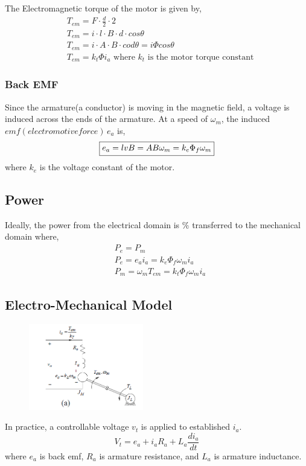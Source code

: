 \documentclass{article}
\begin{document}
    The Electromagnetic torque of the motor is given by,
    \begin{align*}
        &T_{em} = F \cdot \frac{d}{2} \cdot 2\\
        &T_{em} = i\cdot l \cdot B \cdot d \cdot cos \theta \\
        &T_{em} = i \cdot A \cdot B \cdot cod \theta = i \Phi cos\theta\\
        &\boxed{T_{em} = k_{t} \Phi i_{a} } \text{ where $k_{t}$ is the motor torque constant}
    \end{align*}

    \subsubsection*{Back EMF}
    Since the armature(a conductor) is moving in the magnetic field, a voltage is induced 
    across the ends of the armature.
    At a speed of $\omega_{m}$, the induced $emf(electromotive force)\,e_{a}$ is,
    \begin{equation*}
        \boxed{e_{a} = lvB = A B \omega_{m} = k_{e}\Phi_{f} \omega_{m}} \\
    \end{equation*}
    where $k_{e}$ is the voltage constant of the motor.

    \subsection*{Power}
    Ideally, the power from the electrical domain is $\%$ transferred to the mechanical domain where,
    \begin{align*}
        &P_{e} = P_{m}\\
        &P_{e} = e_{a}i_{a} = k_{e} \Phi_{f} \omega_{m} i_{a}\\
        &P_{m} = \omega_{m}T_{em} =  k_{t} \Phi_{f} \omega_{m} i_{a}
    \end{align*}

    \subsection*{Electro-Mechanical Model}
    \begin{figure}[H]
            \centering
            \includegraphics[width=5cm]{figures/elec-mech-model.png}
    \end{figure}
    In practice, a controllable voltage $v_{t}$ is applied to established $i_{a}$.
    \begin{equation*}
        V_{t} = e_{a} + i_{a}R_{a} + L_{a}\frac{di_{a}}{dt}
    \end{equation*}
    where $e_{a}$ is back emf, $R_{a}$ is armature resistance, and $L_{a}$ is armature inductance.
\end{document}
